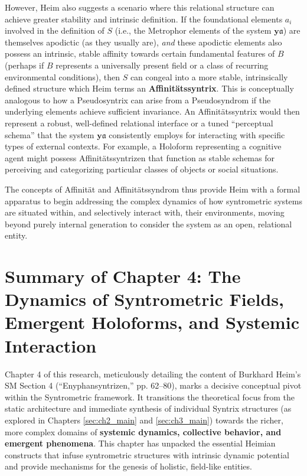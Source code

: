 \documentclass[
    12pt,              %
    a4paper,           %
    headings=normal,   %
    twoside=true,      %
    BCOR=8mm,          %
]{scrbook}
\newcommand{\q}[1]{\enquote{#1}}
\newcommand{\affinitaetssyndrom}{S}
\begin{document}
However, Heim also suggests a scenario where this relational structure can achieve greater stability and intrinsic definition. If the foundational elements \(a_i\) involved in the definition of \(\affinitaetssyndrom\) (i.e., the Metrophor elements of the system \(\bm{y\mathfrak{a}}\)) are themselves apodictic (as they usually are), \textit{and} these apodictic elements also possess an intrinsic, stable affinity towards certain fundamental features of \(B\) (perhaps if \(B\) represents a universally present field or a class of recurring environmental conditions), then \(\affinitaetssyndrom\) can congeal into a more stable, intrinsically defined structure which Heim terms an \textbf{Affinitätssyntrix}. This is conceptually analogous to how a Pseudosyntrix can arise from a Pseudosyndrom if the underlying elements achieve sufficient invariance. An Affinitätssyntrix would then represent a robust, well-defined relational interface or a tuned \q{perceptual schema} that the system \(\bm{y\mathfrak{a}}\) consistently employs for interacting with specific types of external contexts. For example, a Holoform representing a cognitive agent might possess Affinitätssyntrizen that function as stable schemas for perceiving and categorizing particular classes of objects or social situations.

The concepts of Affinität and Affinitätssyndrom thus provide Heim with a formal apparatus to begin addressing the complex dynamics of how syntrometric systems are situated within, and selectively interact with, their environments, moving beyond purely internal generation to consider the system as an open, relational entity.
\section{Summary of Chapter 4: The Dynamics of Syntrometric Fields, Emergent Holoforms, and Systemic Interaction}
\label{sec:ch4_summary_final_revised} 

Chapter 4 of this research, meticulously detailing the content of Burkhard Heim's SM Section 4 (\q{Enyphansyntrizen,} pp. 62–80), marks a decisive conceptual pivot within the Syntrometric framework. It transitions the theoretical focus from the static architecture and immediate synthesis of individual Syntrix structures (as explored in Chapters \ref{sec:ch2_main} and \ref{sec:ch3_main}) towards the richer, more complex domains of \textbf{systemic dynamics, collective behavior, and emergent phenomena}. This chapter has unpacked the essential Heimian constructs that infuse syntrometric structures with intrinsic dynamic potential and provide mechanisms for the genesis of holistic, field-like entities.
\end{document}
